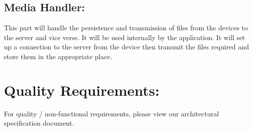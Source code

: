 \documentclass[12pt]{article}
\begin{document}
\subsection{Media Handler:}
This part will handle the persistence and transmission of files from the devices to the server and vice verse.
It will be used internally by the application. It will set up a connection to the server from the device then transmit the files required and store them in the appropriate place.

\newpage

\section{Quality Requirements:}
For quality / non-functional requirements, please view our architectural
\\ specification document.

\newpage
\end{document}
